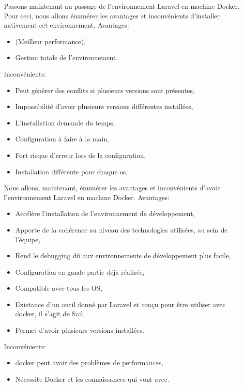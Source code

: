 \documentclass[
    iai, %
    il, %
]{heig-tb}
\begin{document}
Passons maintenant au passage de l'environnement Laravel en machine Docker.
Pour ceci, nous allons énumérer les avantages et inconvénients d'installer nativement cet environnement.
Avantages:
\begin{itemize}
    \item (Meilleur performance),
    \item Gestion totale de l'environnement.
\end{itemize}

Inconvénients:
\begin{itemize}
    \item Peut générer des conflits si plusieurs versions sont présentes,
    \item Impossibilité d'avoir plusieurs versions différentes installées,
    \item L'installation demande du temps,
    \item Configuration à faire à la main,
    \item Fort risque d'erreur lors de la configuration,
    \item Installation différente pour chaque \Gls{os}.
\end{itemize}

Nous allons, maintenant, énumérer les avantages et inconvénients d'avoir l'environnement Laravel en machine Docker.
Avantages:
\begin{itemize}
    \item Accélère l'installation de l'environnement de développement, \cite{labrecque}
    \item Apporte de la cohérence au niveau des technologies utilisées, au sein de l'équipe, \cite{labrecque}
    \item Rend le debugging dû aux environnements de développement plus facile, \cite{labrecque}
    \item Configuration en gande partie déjà réalisée,
    \item Compatible avec tous les OS,
    \item Existance d'un outil donné par Laravel et conçu pour être utiliser avec \Gls{docker}, il s'agit de \href{https://laravel.com/docs/9.x/sail}{Sail},
    \item Permet d'avoir plusieurs versions installées.
\end{itemize}

Inconvénients:
\begin{itemize}
    \item \Gls{docker} peut avoir des problèmes de performances, \cite{labrecque}
    \item Nécessite Docker et les connaissances qui vont avec. \cite{labrecque}
\end{itemize}
\end{document}
